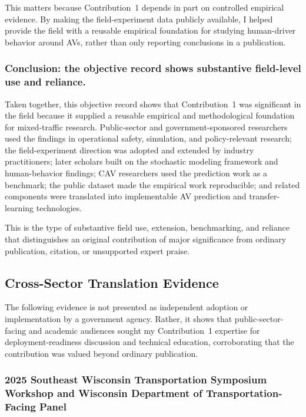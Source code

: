 \documentclass[11pt,letterpaper]{article}
\begin{document}
This matters because Contribution~1 depends in part on controlled empirical evidence. By making the field-experiment data publicly available, I helped provide the field with a reusable empirical foundation for studying human-driver behavior around AVs, rather than only reporting conclusions in a publication.

\subsubsection{Conclusion: the objective record shows substantive field-level use and reliance.}

Taken together, this objective record shows that Contribution~1 was significant in the field because it supplied a reusable empirical and methodological foundation for mixed-traffic research. Public-sector and government-sponsored researchers used the findings in operational safety, simulation, and policy-relevant research; the field-experiment direction was adopted and extended by industry practitioners; later scholars built on the stochastic modeling framework and human-behavior findings; CAV researchers used the prediction work as a benchmark; the public dataset made the empirical work reproducible; and related components were translated into implementable AV prediction and transfer-learning technologies.

This is the type of substantive field use, extension, benchmarking, and reliance that distinguishes an original contribution of major significance from ordinary publication, citation, or unsupported expert praise.

\subsection{Cross-Sector Translation Evidence}

The following evidence is not presented as independent adoption or implementation by a government agency. Rather, it shows that public-sector-facing and academic audiences sought my Contribution~1 expertise for deployment-readiness discussion and technical education, corroborating that the contribution was valued beyond ordinary publication.

\subsubsection{2025 Southeast Wisconsin Transportation Symposium Workshop and Wisconsin Department of Transportation-Facing Panel}
\end{document}
